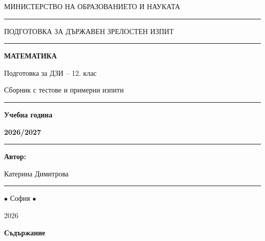 \documentclass[12pt,a4paper]{article}
\begin{document}
\begin{titlepage}
\centering
\vspace*{2cm}
{\large МИНИСТЕРСТВО НА ОБРАЗОВАНИЕТО И НАУКАТА\par}
\vspace{-0.2cm}
\noindent\rule{0.8\textwidth}{0.5pt}
\vspace{0.3cm}
{\large ПОДГОТОВКА ЗА ДЪРЖАВЕН ЗРЕЛОСТЕН ИЗПИТ\par}
\vspace{-0.4cm}
\noindent\rule{0.8\textwidth}{0.5pt}
\vspace{0.8cm}
\vspace{1.5cm}
{\Huge\bfseries МАТЕМАТИКА\par}
\vspace{0.6cm}
{\Large Подготовка за ДЗИ -- 12. клас\par}
\vspace{0.6cm}
{\Large Сборник с тестове и примерни изпити\par}
\vspace{2.4cm}
\noindent\rule{1.0\textwidth}{0.5pt}
\vspace{0.4cm}
{\Large\bfseries Учебна година\par}
{\Large\bfseries 2026/2027 \par}
\vspace{-0.2cm}
\noindent\rule{1.0\textwidth}{0.5pt}
{\Large\bfseries Автор:\par}
{\large Катерина Димитрова\par}
\noindent\rule{1.0\textwidth}{0.5pt}
\vfill
{\large $\bullet$ София $\bullet$ \par}
{\large 2026 \par}
\end{titlepage}

\newpage
\begin{center}
{\LARGE\bfseries\color{tocgreen} Съдържание}
\end{center}
\vspace{0.5cm}
\end{document}
